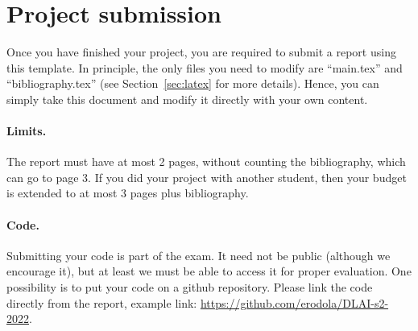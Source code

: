 \documentclass{article}
\begin{document}

\printAffiliationsAndNotice{}

\begin{abstract}
%
This is a \LaTeX template for writing your project report, to be submitted as part of the final exam. The template can not be modified (you can not change margins, spaces, etc.), and using this template is mandatory. Please read the main text for further details.
%
\end{abstract}

\section{Project submission}

Once you have finished your project, you are required to submit a report using this template. In principle, the only files you need to modify are ``main.tex'' and ``bibliography.tex'' (see Section~\ref{sec:latex} for more details). Hence, you can simply take this document and modify it directly with your own content.

\paragraph*{Limits.}
The report must have at most 2 pages, without counting the bibliography, which can go to page 3. If you did your project with another student, then your budget is extended to at most 3 pages plus bibliography.

\paragraph*{Code.} 
Submitting your code is part of the exam. It need not be public (although we encourage it), but at least we must be able to access it for proper evaluation. One possibility is to put your code on a github repository. Please link the code directly from the report, example link: \url{https://github.com/erodola/DLAI-s2-2022}.
\end{document}
